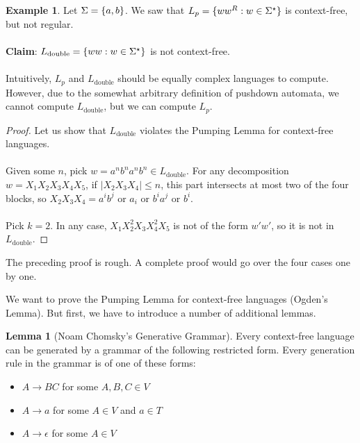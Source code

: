 \documentclass[]{article}
\DeclarePairedDelimiter{\set}{\lbrace}{\rbrace}
\theoremstyle{definition}
\newtheorem*{lemma}{Lemma}
\newtheorem{ex}{Example}[section]
\begin{document}
      \begin{ex}
        Let $\Sigma = \set{a, b}$. We saw that $L_p = \set{w w^R : w \in \Sigma^\star}$ is context-free, but not regular.
        \\ \\
        \textbf{Claim}: $L_\text{double} = \set{ ww : w  \in \Sigma^\star }$ is not context-free.
        \\ \\
        Intuitively, $L_p$ and $L_\text{double}$ should be equally complex languages to compute. However, due to the somewhat arbitrary definition of pushdown automata, we cannot compute $L_\text{double}$, but we can compute $L_p$.

        \begin{proof}
          Let us show that $L_\text{double}$ violates the Pumping Lemma for context-free languages.
          \\ \\
          Given some $n$, pick $w = a^n b^n a^n b^n \in L_\text{double}$. For any decomposition $w = X_1 X_2 X_3 X_4 X_5$, if $|X_2 X_3 X_4| \le n$, this part intersects at most two of the four blocks, so $X_2 X_3 X_4 = a^i b^j$ or $a_i$ or $b^i a^j$ or $b^i$.
          \\ \\
          Pick $k = 2$. In any case, $X_1 X_2^2 X_3 X_4^2 X_5$ is not of the form $w' w'$, so it is not in $L_\text{double}$.
        \end{proof}

        The preceding proof is rough. A complete proof would go over the four cases one by one.
      \end{ex}

      We want to prove the Pumping Lemma for context-free languages (Ogden's Lemma). But first, we have to introduce a number of additional lemmas.

      \begin{lemma}[Noam Chomsky's Generative Grammar]
        Every context-free language can be generated by a grammar of the following restricted form. Every generation rule in the grammar is of one of these forms:
        \begin{itemize}
          \item $A \to BC$ for some $A, B, C \in V$
          \item $A \to a$ for some $A \in V$ and $a \in T$
          \item $A \to \epsilon$ for some $A \in V$
        \end{itemize}
      \end{lemma}
\end{document}
